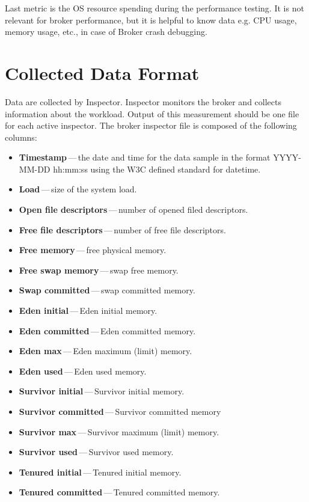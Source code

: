 Last metric is the OS resource spending during the performance testing. It is not relevant for broker performance, but it is helpful to know data e.g. CPU usage, memory usage, etc., in case of Broker crash debugging.

\section{Collected Data Format}
\label{Collected Data Format}
Data are collected by Inspector. Inspector monitors the broker and collects information about the workload. Output of this measurement should be one file for each active inspector. The broker inspector file is composed of the following columns:

\begin{itemize}
	\setlength\itemsep{0em}
	\item \textbf{Timestamp}\,---\,the date and time for the data sample in the format YYYY-MM-DD hh:mm:ss using the W3C defined standard for datetime.
	\item \textbf{Load}\,---\,size of the system load.
	\item \textbf{Open file descriptors}\,---\,number of opened filed descriptors.
	\item \textbf{Free file descriptors}\,---\,number of free file descriptors.
	\item \textbf{Free memory}\,---\,free physical memory.
	\item \textbf{Free swap memory}\,---\,swap free memory.
	\item \textbf{Swap committed}\,---\,swap committed memory.
	\item \textbf{Eden initial}\,---\,Eden initial memory.
	\item \textbf{Eden committed}\,---\,Eden committed memory.
	\item \textbf{Eden max}\,---\,Eden maximum (limit) memory.
	\item \textbf{Eden used}\,---\,Eden used memory.
	\item \textbf{Survivor initial}\,---\,Survivor initial memory.
	\item \textbf{Survivor committed}\,---\,Survivor committed memory
	\item \textbf{Survivor max}\,---\,Survivor maximum (limit) memory.
	\item \textbf{Survivor used}\,---\,Survivor used memory.
	\item \textbf{Tenured initial}\,---\,Tenured initial memory.
	\item \textbf{Tenured committed}\,---\,Tenured committed memory.

\end{itemize}
